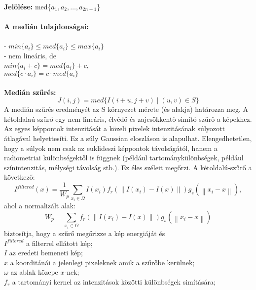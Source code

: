  \textbf{Jelölése:} med\{$a_1,a_2,\dots,a_{2n+1}$\}\\ \\
 \textbf{A medián tulajdonságai:}\\
 \\
- $min\{a_i\}\leq med\{a_i\}\leq max\{a_i\}$\\
- nem lineáris, de\\
\indent $min\{a_i+c\}=med\{a_i\}+c$,\\
\indent $med\{c\cdot a_i\}=c \cdot med\{a_i\}$\\
\\
\textbf{Medián szűrés:}\\
$$J(i,j)=med\{I(i+u,j+v)\mid (u,v)\in S \}$$ 
A medián szűrés eredményét az S környezet mérete (és alakja) határozza meg.
A kétoldalaú szűrő egy nem lineáris, élvédő és zajcsökkentő simító szűrő a képekhez. Az egyes képpontok intenzitását a közeli pixelek intenzitásának súlyozott átlagával helyettesíti. Ez a súly Gaussian eloszláson is  alapulhat. Elengedhetetlen, hogy a súlyok nem csak az euklideszi képpontok távolságától, hanem a radiometriai különbségektől is függnek (például tartománykülönbségek, például színintenzitás, mélységi távolság stb.). Ez éles széleit megőrzi. A kétoldalú-szűrő a következő:
$$I^{filtered}(x)=\frac{1}{W_p}\sum_{x_i\in\Omega}{I(x_i)f_r(\left \| I(x_i)-I(x) \right \|)g_s(\left \| x_i-x \right \|)},$$
ahol a normalizált alak: 
$$W_p=\sum_{x_i\in\Omega}f_r(\left \| I(x_i)-I(x) \right \|)g_s(\left \| x_i-x \right \|)$$
biztosítja, hogy a szűrő megőrizze a kép energiáját és\\
\indent $I^{filtered}$ a filterrel ellátott kép;\\
\indent$I$ az eredeti bemeneti kép;\\
\indent$x$ a koorditánái a jelenlegi pixeleknek amik a szűrőbe kerülnek;\\
\indent$\omega$ az ablak közepe $x$-nek;\\
\indent$f_r$ a tartományi kernel az intenzitások közötti különbségek simítására;\\
